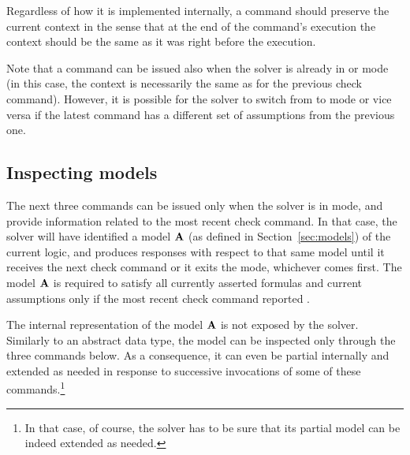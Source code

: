 \begin{description}
Regardless of how it is implemented internally, 
a  command should preserve the current context 
in the sense that at the end of the command's execution the context should be 
the same as it was right before the execution.

Note that a  command can be issued also 
when the solver is already in  or  mode
(in this case, the context is necessarily the same as for the previous check command).
However, it is possible for the solver to switch from  
to  mode or vice versa if the latest command has 
a different set of assumptions from the previous one.

\end{description}


\subsection{Inspecting models} 

The next three commands can be issued only when the solver is 
in  mode, and provide information related 
to the most recent check command.
In that case, the solver will have identified a model $\mathbf{A}$ 
(as defined in Section~\ref{sec:models}) of the current logic,
and produces responses with respect to that same model until 
it receives the next check command or it exits the  mode,
whichever comes first.
The model $\mathbf{A}$ is required to satisfy all currently asserted formulas 
and current assumptions only if the most recent check command
reported .

The internal representation of the model $\mathbf{A}$ is not exposed by the solver.
Similarly to an abstract data type, the model can be inspected only 
through the three commands below.
As a consequence, it can even be partial internally and extended as needed 
in response to successive invocations of some of these commands.\footnote{%
In that case, of course, the solver has to be sure 
that its partial model can be indeed extended as needed.
}

